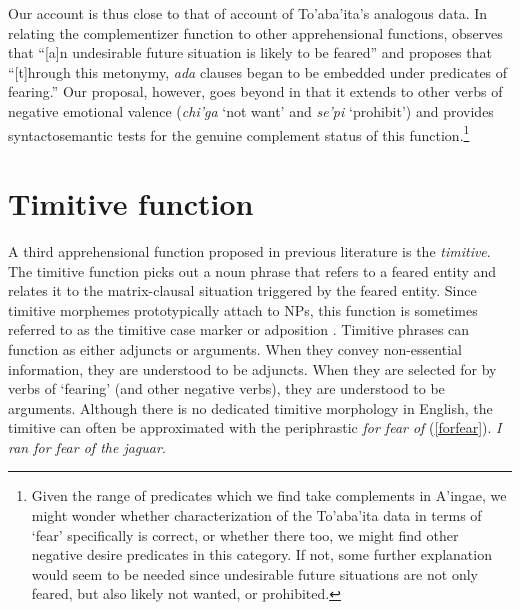 \documentclass[output=paper,colorlinks,citecolor=brown]{langscibook}
\begin{document}
Our account is thus close to that of  account of To'aba'ita's analogous data. In relating the complementizer function to other apprehensional functions, \citet[305]{lichtenberk1995apprehensional} observes that ``[a]n undesirable future situation is likely to be feared'' and proposes that ``[t]hrough this metonymy, \textit{ada} clauses began to be embedded under predicates of fearing.'' Our proposal, however, goes beyond  in that it extends to other verbs of negative emotional valence (\ie \emph{chi'ga} `not want' and \emph{se'pi} `prohibit') and provides syntactosemantic tests for the genuine complement status of this function.\footnote{Given the range of predicates which we find take  complements in A'ingae, we might wonder whether  characterization of the To'aba'ita data in terms of `fear' specifically is correct, or whether there too, we might find other negative desire predicates in this category. If not, some further explanation would seem to be needed since undesirable future situations are not only feared, but also likely not wanted, or prohibited.}




\section{Timitive function} \label{sec:timitivefunction}

A third apprehensional function proposed in previous literature is the \emph{timitive}. The timitive function picks out a noun phrase that refers to a feared entity and relates it to the matrix-clausal situation triggered by the feared entity. Since timitive morphemes prototypically attach to NPs, this function is sometimes referred to as the timitive case marker or adposition \citep{vuillermet2018a, VuillermetM2018questionnaire}. Timitive phrases can function as either adjuncts or arguments. When they convey non-essential information, they are understood to be adjuncts. When they are selected for by verbs of `fearing' (and other negative verbs), they are understood to be arguments. Although there is no dedicated timitive morphology in English, the timitive can often be approximated with the periphrastic \emph{for fear of} (\ref{forfear}).
    \ea \label{forfear}
    \glt \textit{I ran for fear of the jaguar}.
    \z
\end{document}

